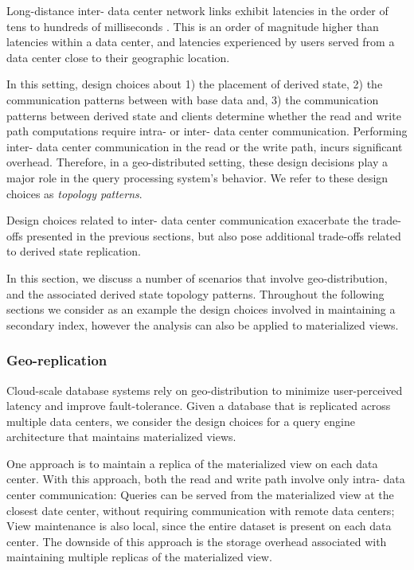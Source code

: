 Long-distance inter- data center network links exhibit latencies in the order of tens to hundreds of milliseconds \cite{pbailis:hats}.
This is an order of magnitude higher than latencies within a data center,
and latencies experienced by users served from a data center close to their geographic location.

In this setting, design choices about 1) the placement of derived state,
2) the communication patterns between with base data and, 3) the communication patterns between derived state and clients
determine whether the read and write path computations require intra- or inter- data center communication.
Performing inter- data center communication in the read or the write path,
incurs significant overhead.
Therefore, in a geo-distributed setting,
these design decisions play a major role in the query processing system's behavior.
We refer to these design choices as \textit{topology patterns}.

Design choices related to inter- data center communication exacerbate the trade-offs presented in the previous sections,
but also pose additional trade-offs related to derived state replication.

In this section, we discuss a number of scenarios that involve geo-distribution, and the associated derived state
topology patterns.
Throughout the following sections we consider as an example the design choices involved in maintaining a secondary index,
however the analysis can also be applied to materialized views.

\subsubsection{Geo-replication}
Cloud-scale database systems rely on geo-distribution to minimize user-perceived latency and improve fault-tolerance.
Given a database that is replicated across multiple data centers, we consider the design choices for a
query engine architecture that maintains materialized views.

One approach is to maintain a replica of the materialized view on each data center.
With this approach, both the read and write path involve only intra- data center communication:
Queries can be served from the materialized view at the closest date center, without requiring communication with
remote data centers;
View maintenance is also local, since the entire dataset is present on each data center.
The downside of this approach is the storage overhead associated with maintaining multiple replicas of the materialized
view.

